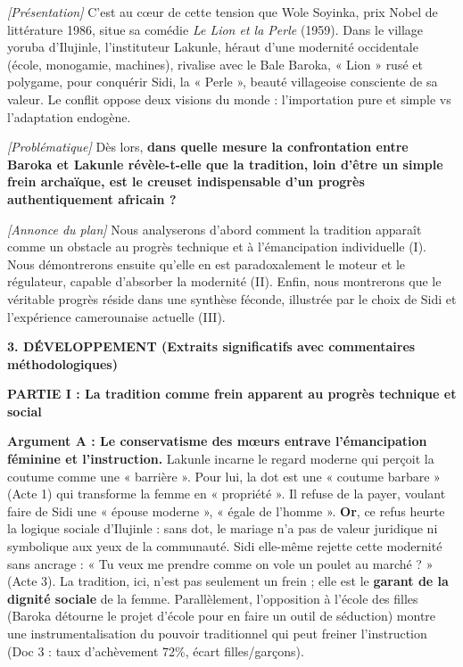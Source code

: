 \documentclass[11pt]{article}
\begin{document}
\begin{exoresolu}
\noindent \textit{[Présentation]} C'est au cœur de cette tension que Wole Soyinka, prix Nobel de littérature 1986, situe sa comédie \emph{Le Lion et la Perle} (1959). Dans le village yoruba d'Ilujinle, l'instituteur Lakunle, héraut d'une modernité occidentale (école, monogamie, machines), rivalise avec le Bale Baroka, « Lion » rusé et polygame, pour conquérir Sidi, la « Perle », beauté villageoise consciente de sa valeur. Le conflit oppose deux visions du monde : l'importation pure et simple vs l'adaptation endogène.

\noindent \textit{[Problématique]} Dès lors, \textbf{dans quelle mesure la confrontation entre Baroka et Lakunle révèle-t-elle que la tradition, loin d'être un simple frein archaïque, est le creuset indispensable d'un progrès authentiquement africain ?}

\noindent \textit{[Annonce du plan]} Nous analyserons d'abord comment la tradition apparaît comme un obstacle au progrès technique et à l'émancipation individuelle (I). Nous démontrerons ensuite qu'elle en est paradoxalement le moteur et le régulateur, capable d'absorber la modernité (II). Enfin, nous montrerons que le véritable progrès réside dans une synthèse féconde, illustrée par le choix de Sidi et l'expérience camerounaise actuelle (III).

\medskip
\noindent \textbf{3. DÉVELOPPEMENT (Extraits significatifs avec commentaires méthodologiques)}

\noindent \textbf{PARTIE I : La tradition comme frein apparent au progrès technique et social}

\noindent \textbf{Argument A : Le conservatisme des mœurs entrave l'émancipation féminine et l'instruction.}
Lakunle incarne le regard moderne qui perçoit la coutume comme une « barrière ». Pour lui, la dot est une « coutume barbare » (Acte 1) qui transforme la femme en « propriété ». Il refuse de la payer, voulant faire de Sidi une « épouse moderne », « égale de l'homme ». \textbf{Or}, ce refus heurte la logique sociale d'Ilujinle : sans dot, le mariage n'a pas de valeur juridique ni symbolique aux yeux de la communauté. Sidi elle-même rejette cette modernité sans ancrage : « Tu veux me prendre comme on vole un poulet au marché ? » (Acte 3). La tradition, ici, n'est pas seulement un frein ; elle est le \textbf{garant de la dignité sociale} de la femme. Parallèlement, l'opposition à l'école des filles (Baroka détourne le projet d'école pour en faire un outil de séduction) montre une instrumentalisation du pouvoir traditionnel qui peut freiner l'instruction (Doc 3 : taux d'achèvement 72\%, écart filles/garçons).


\end{exoresolu}
\end{document}
